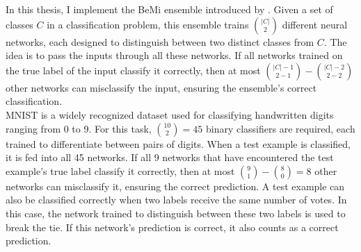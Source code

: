 \noindent In this thesis, I implement the BeMi ensemble introduced by \cite{ambrogio2023}. Given a set of classes $C$ in a classification problem, this ensemble trains $\binom{\vert C \vert} {2}$ different neural networks, each designed to distinguish between two distinct classes from $C$. The idea is to pass the inputs through all these networks. If all networks trained on the true label of the input classify it correctly, then at most $\binom{\vert C \vert - 1}{2-1} - \binom{\vert C \vert - 2}{2-2}$ other networks can misclassify the input, ensuring the ensemble's correct classification. \\

\noindent MNIST is a widely recognized dataset used for classifying handwritten digits ranging from 0 to 9. For this task, $\binom{10}{2} = 45$ binary classifiers are required, each trained to differentiate between pairs of digits. When a test example is classified, it is fed into all 45 networks. If all 9 networks that have encountered the test example's true label classify it correctly, then at most $\binom{9}{1} - \binom{8}{0} = 8 $ other networks can misclassify it, ensuring the correct prediction. A test example can also be classified correctly when two labels receive the same number of votes. In this case, the network trained to distinguish between these two labels is used to break the tie. If this network's prediction is correct, it also counts as a correct prediction.
